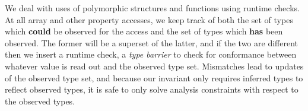 We deal with uses of polymorphic structures and functions using runtime checks.
At all array and other property accesses, we keep track of both the set of
types which {\bf could} be observed for the access and the set of types
which {\bf has} been observed.
The former will be a superset of the latter, and if the two are different then
we insert a runtime check, a {\it type barrier} to check for conformance
between whatever value is read out and the observed type set.
Mismatches lead to updates of the observed type set, and because our
invariant only requires inferred types to reflect observed types, it is
safe to only solve analysis constraints with respect to the observed types.

